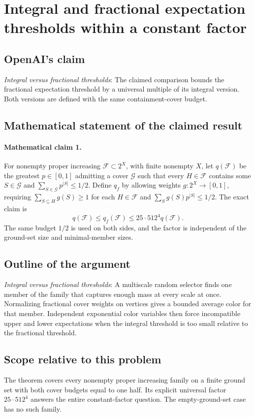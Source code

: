 \documentclass[11pt]{article}
\begin{document}
\section*{Integral and fractional expectation thresholds within a constant factor}

\subsection{OpenAI's claim}
\textit{Integral versus fractional thresholds}: The claimed comparison bounds the fractional expectation threshold by a universal multiple of its integral version. Both versions are defined with the same containment-cover budget.

\subsection{Mathematical statement of the claimed result}
\paragraph{Mathematical claim 1.} For nonempty proper increasing $\mathcal F\subset2^X$, with finite nonempty $X$, let $q(\mathcal F)$ be the greatest $p\in[0,1]$ admitting a cover $\mathcal G$ such that every $H\in\mathcal F$ contains some $S\in\mathcal G$ and $\sum_{S\in\mathcal G}p^{|S|}\le1/2$. Define $q_f$ by allowing weights $g:2^X\to[0,1]$, requiring $\sum_{S\subseteq H}g(S)\ge1$ for each $H\in\mathcal F$ and $\sum_Sg(S)p^{|S|}\le1/2$. The exact claim is \[q(\mathcal F)\le q_f(\mathcal F)\le25\cdot512^4q(\mathcal F).\] The same budget $1/2$ is used on both sides, and the factor is independent of the ground-set size and minimal-member sizes.

\subsection{Outline of the argument}
\textit{Integral versus fractional thresholds}: A multiscale random selector finds one member of the family that captures enough mass at every scale at once. Normalizing fractional cover weights on vertices gives a bounded average color for that member. Independent exponential color variables then force incompatible upper and lower expectations when the integral threshold is too small relative to the fractional threshold.

\subsection{Scope relative to this problem}
The theorem covers every nonempty proper increasing family on a finite ground set with both cover budgets equal to one half. Its explicit universal factor $25\cdot512^4$ answers the entire constant-factor question. The empty-ground-set case has no such family.
\end{document}
